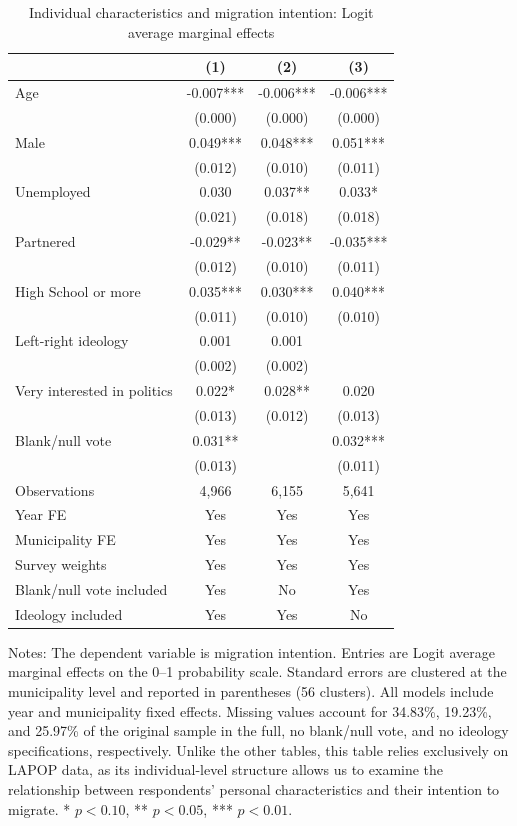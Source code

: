 \begin{table}[htbp]
\normalsize
\renewcommand{\arraystretch}{1.25}
\setlength{\tabcolsep}{6pt}
\centering
\caption{Individual characteristics and migration intention: Logit average marginal effects}
\label{tab:individual_characteristics_ame_stata}
\setlength{\tabcolsep}{4pt}
\captionsetup{justification=centering}
\begin{tabular}{lccc}
\hline
 & (1) & (2) & (3) \\
\hline
Age & -0.007*** & -0.006*** & -0.006*** \\
 & (0.000) & (0.000) & (0.000) \\
Male & 0.049*** & 0.048*** & 0.051*** \\
 & (0.012) & (0.010) & (0.011) \\
Unemployed & 0.030 & 0.037** & 0.033* \\
 & (0.021) & (0.018) & (0.018) \\
Partnered & -0.029** & -0.023** & -0.035*** \\
 & (0.012) & (0.010) & (0.011) \\
High School or more & 0.035*** & 0.030*** & 0.040*** \\
 & (0.011) & (0.010) & (0.010) \\
Left-right ideology & 0.001 & 0.001 &  \\
 & (0.002) & (0.002) &  \\
Very interested in politics & 0.022* & 0.028** & 0.020 \\
 & (0.013) & (0.012) & (0.013) \\
Blank/null vote & 0.031** &  & 0.032*** \\
 & (0.013) &  & (0.011) \\
\hline
Observations &        4,966 &        6,155 &        5,641 \\
Year FE & Yes & Yes & Yes \\
Municipality FE & Yes & Yes & Yes \\
Survey weights & Yes & Yes & Yes \\
Blank/null vote included & Yes & No & Yes \\
Ideology included & Yes & Yes & No \\
\hline
\end{tabular}
\par\vspace{1.5mm}
\begin{minipage}{0.98\linewidth}
\footnotesize\setlength{\parindent}{0pt}\setlength{\parskip}{1pt}
Notes: The dependent variable is migration intention. Entries are Logit average marginal effects on the 0--1 probability scale. Standard errors are clustered at the municipality level and reported in parentheses (56 clusters). All models include year and municipality fixed effects. Missing values account for 34.83\%, 19.23\%, and 25.97\% of the original sample in the full, no blank/null vote, and no ideology specifications, respectively. Unlike the other tables, this table relies exclusively on LAPOP data, as its individual-level structure allows us to examine the relationship between respondents' personal characteristics and their intention to migrate. * \(p<0.10\), ** \(p<0.05\), *** \(p<0.01\).
\end{minipage}
\end{table}
